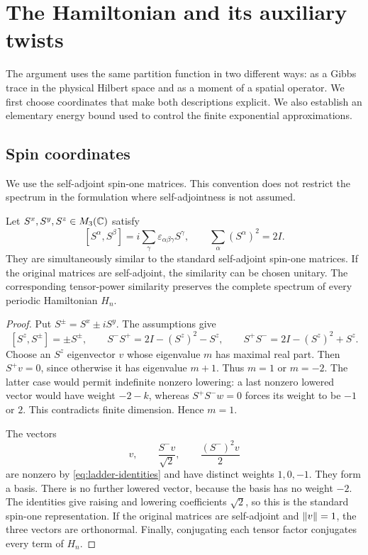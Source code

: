 \section{The Hamiltonian and its auxiliary twists}\label{sec:model}

The argument uses the same partition function in two different ways: as
a Gibbs trace in the physical Hilbert space and as a moment of a spatial
operator. We first choose coordinates that make both descriptions explicit.
We also establish an elementary energy bound used to control the finite
exponential approximations.

\subsection{Spin coordinates}

We use the self-adjoint spin-one matrices. This convention does not restrict
the spectrum in the formulation where self-adjointness is not assumed.

\begin{lemma}\label{lem:representation}
Let $S^x,S^y,S^z\in M_3(\mathbb C)$ satisfy
\[
 [S^\alpha,S^\beta]
   =i\sum_\gamma\varepsilon_{\alpha\beta\gamma}S^\gamma,
 \qquad \sum_\alpha(S^\alpha)^2=2I.
\]
They are simultaneously similar to the standard self-adjoint spin-one
matrices. If the original matrices are self-adjoint, the similarity can be
chosen unitary. The corresponding tensor-power similarity preserves the
complete spectrum of every periodic Hamiltonian $H_n$.
\end{lemma}

\begin{proof}
Put $S^\pm=S^x\pm iS^y$. The assumptions give
\begin{equation}\label{eq:ladder-identities}
 [S^z,S^\pm]=\pm S^\pm,\qquad
 S^-S^+=2I-(S^z)^2-S^z,\qquad
 S^+S^-=2I-(S^z)^2+S^z.
\end{equation}
Choose an $S^z$ eigenvector $v$ whose eigenvalue $m$ has maximal real part.
Then $S^+v=0$, since otherwise it has eigenvalue $m+1$. Thus $m=1$ or
$m=-2$. The latter case would permit indefinite nonzero lowering: a last
nonzero lowered vector would have weight $-2-k$, whereas
$S^+S^-w=0$ forces its weight to be $-1$ or $2$. This contradicts finite
dimension. Hence $m=1$.

The vectors
\[
 v,\qquad \frac{S^-v}{\sqrt2},\qquad \frac{(S^-)^2v}{2}
\]
are nonzero by \eqref{eq:ladder-identities} and have distinct weights
$1,0,-1$. They form a basis. There is no further lowered vector, because
the basis has no weight $-2$. The identities give raising and lowering
coefficients $\sqrt2$, so this is the standard spin-one representation.
If the original matrices are self-adjoint and $\left\lVert v\right\rVert=1$, the three
vectors are orthonormal. Finally, conjugating each tensor factor conjugates
every term of $H_n$.
\end{proof}

